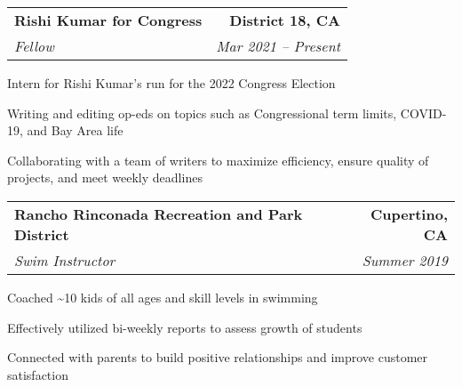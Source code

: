 \documentclass{article}
\newlength{\secskip}
\begin{document}
\goodbreak\vspace{\secskip}\par\noindent\begin{tabularx}{\linewidth}{Xr}
    \textbf{Rishi Kumar for Congress} & \textbf{District 18, CA}\\
    \textit{Fellow} & \textit{Mar 2021 -- Present}\\
\end{tabularx}
\begin{compactitem}
    \item Intern for Rishi Kumar's run for the 2022 Congress Election
    \item Writing and editing op-eds on topics such as Congressional term limits, COVID-19, and Bay Area life
    \item Collaborating with a team of writers to maximize efficiency, ensure quality of projects, and meet weekly deadlines
\end{compactitem}

\goodbreak\vspace{\secskip}\par\noindent\begin{tabularx}{\linewidth}{Xr}
    \textbf{Rancho Rinconada Recreation and Park District} & \textbf{Cupertino, CA}\\
    \textit{Swim Instructor} & \textit{Summer 2019}\\
\end{tabularx}
\begin{compactitem}
    \item Coached \textasciitilde{}10 kids of all ages and skill levels in swimming
    \item Effectively utilized bi-weekly reports to assess growth of students
    \item Connected with parents to build positive relationships and improve customer satisfaction
\end{compactitem}
\end{document}
